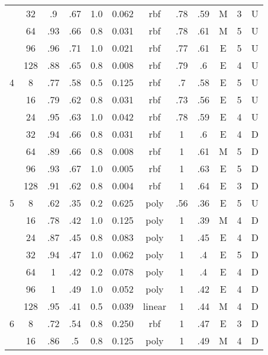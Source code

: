 \begin{table}
\begin{tabular}{|c|c|ccccc||ccccc|}
  &  32 &    .9 &  .67 & 1.0 &    0.062 &    rbf &   .78 &  .59 &      M & 3 &       U \\
  &  64 &   .93 &  .66 & 0.8 &    0.031 &    rbf &   .78 &  .61 &      M & 5 &       U \\
  &  96 &   .96 &  .71 & 1.0 &    0.021 &    rbf &   .77 &  .61 &      E & 5 &       U \\
  & 128 &   .88 &  .65 & 0.8 &    0.008 &    rbf &   .79 &   .6 &      E & 4 &       U \\\hline
4 &   8 &   .77 &  .58 & 0.5 &    0.125 &    rbf &    .7 &  .58 &      E & 5 &       U \\
  &  16 &   .79 &  .62 & 0.8 &    0.031 &    rbf &   .73 &  .56 &      E & 5 &       U \\
  &  24 &   .95 &  .63 & 1.0 &    0.042 &    rbf &   .78 &  .59 &      E & 4 &       U \\
  &  32 &   .94 &  .66 & 0.8 &    0.031 &    rbf &     1 &   .6 &      E & 4 &       D \\
  &  64 &   .89 &  .66 & 0.8 &    0.008 &    rbf &     1 &  .61 &      M & 5 &       D \\
  &  96 &   .93 &  .67 & 1.0 &    0.005 &    rbf &     1 &  .63 &      E & 5 &       D \\
  & 128 &   .91 &  .62 & 0.8 &    0.004 &    rbf &     1 &  .64 &      E & 3 &       D \\\hline
5 &   8 &   .62 &  .35 & 0.2 &    0.625 &   poly &   .56 &  .36 &      E & 5 &       U \\
  &  16 &   .78 &  .42 & 1.0 &    0.125 &   poly &     1 &  .39 &      M & 4 &       D \\
  &  24 &   .87 &  .45 & 0.8 &    0.083 &   poly &     1 &  .45 &      E & 4 &       D \\
  &  32 &   .94 &  .47 & 1.0 &    0.062 &   poly &     1 &   .4 &      E & 5 &       D \\
  &  64 &     1 &  .42 & 0.2 &    0.078 &   poly &     1 &   .4 &      E & 4 &       D \\
  &  96 &     1 &  .49 & 1.0 &    0.052 &   poly &     1 &  .42 &      E & 4 &       D \\
  & 128 &   .95 &  .41 & 0.5 &    0.039 & linear &     1 &  .44 &      M & 4 &       D \\\hline
6 &   8 &   .72 &  .54 & 0.8 &    0.250 &    rbf &     1 &  .47 &      E & 3 &       D \\
  &  16 &   .86 &   .5 & 0.8 &    0.125 &   poly &     1 &  .49 &      M & 4 &       D \\

\end{tabular}
\end{table}
